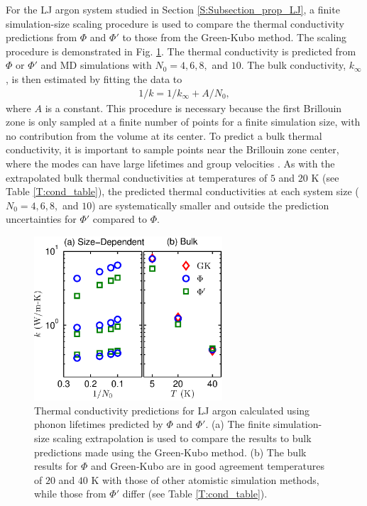 \documentclass[12pt,twocolumn,iop]{/usr/share/texmf-texlive/tex/latex/iop/iopart}[/usr/share/texmf-texlive/tex/latex/iop/]
\begin{document}
For the LJ argon system studied in Section \ref{S:Subsection_prop_LJ}, a finite simulation-size scaling procedure\cite{turney2009a,He2011} is used to compare the thermal conductivity predictions from $\Phi$ and $\Phi'$ to those from the Green-Kubo method. The scaling procedure is demonstrated in Fig$.$ \ref{F:LJ_COND}.  The thermal conductivity is predicted from $\Phi$ or $\Phi'$ and MD simulations with $N_0 = 4,6,8,$ and $10$. The bulk conductivity, $k_{\infty}$, is then estimated by fitting the data to
\begin{equation}\label{k_size}
\begin{split}
1/k = 1/k_{\infty} + A/N_0,
 \end{split}
\end{equation}
where $A$ is a constant. This procedure is necessary because the first Brillouin zone is only sampled at a finite number of points for a finite simulation size, with no contribution from the volume at its center. To predict a bulk thermal conductivity, it is important to sample points near the Brillouin zone center, where the modes can have large lifetimes and group velocities \cite{turney2009a,sellan2010b}. As with the extrapolated bulk thermal conductivities at temperatures of $5$ and $20$ K (see Table \ref{T:cond_table}), the predicted thermal conductivities at each system size ($N_0=4,6,8,$ and $10$) are systematically smaller and outside the prediction uncertainties for $\Phi'$ compared to $\Phi$.

\begin{figure}
\begin{center}
\includegraphics[angle=0,width=70.0mm]{figure6.eps}
\caption{\label{F:LJ_COND} Thermal conductivity predictions for LJ argon calculated using phonon lifetimes predicted by $\Phi$ and $\Phi'$. (a) The finite simulation-size scaling extrapolation \cite{turney2009a,He2011} is used to compare the results to bulk predictions made using the Green-Kubo method. (b) The bulk results for $\Phi$ and Green-Kubo are in good agreement temperatures of $20$ and $40$ K with those of other atomistic simulation methods,\cite{turney2009a} while those from $\Phi'$ differ (see Table \ref{T:cond_table}).}
\end{center}
\end{figure}

\setcounter{section}{1}

\vspace*{100mm}






\end{document}
